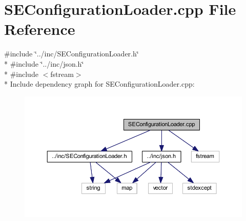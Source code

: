 \section{S\+E\+Configuration\+Loader.\+cpp File Reference}
\label{_s_e_configuration_loader_8cpp}
{\ttfamily \#include \char`\"{}../inc/\+S\+E\+Configuration\+Loader.\+h\char`\"{}}\\*
{\ttfamily \#include \char`\"{}../inc/json.\+h\char`\"{}}\\*
{\ttfamily \#include $<$fstream$>$}\\*
Include dependency graph for S\+E\+Configuration\+Loader.\+cpp\+:
\nopagebreak
\begin{figure}[H]
\begin{center}
\leavevmode
\includegraphics[width=350pt]{_s_e_configuration_loader_8cpp__incl}
\end{center}
\end{figure}
